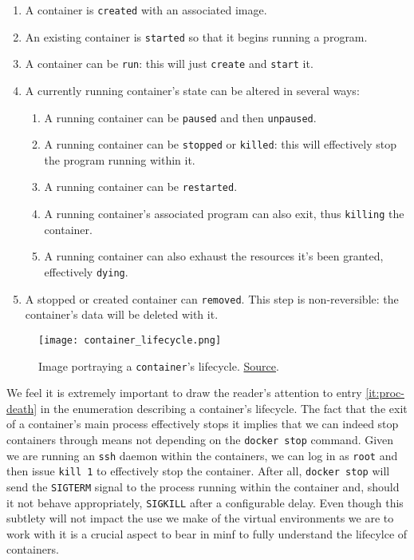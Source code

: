                 \begin{enumerate}
                    \item A container is \texttt{created} with an associated image.
                    \item An existing container is \texttt{started} so that it begins running a program.
                    \item A container can be \texttt{run}: this will just \texttt{create} and \texttt{start} it.
                    \item A currently running container's state can be altered in several ways:
                    \begin{enumerate}
                        \item A running container can be \texttt{paused} and then \texttt{unpaused}.
                        \item A running container can be \texttt{stopped} or \texttt{killed}: this will effectively stop the program running within it.
                        \item A running container can be \texttt{restarted}.
                        \item A running container's associated program can also exit, thus \texttt{killing} the container. \label{it:proc-death}
                        \item A running container can also exhaust the resources it's been granted, effectively \texttt{dying}.
                    \end{enumerate}
                    \item A stopped or created container can \texttt{removed}. This step is non-reversible: the container's data will be deleted with it.
                \end{enumerate}

                \begin{figure}
                    \centering
                    \texttt{[image: container\_lifecycle.png]}
                    \caption{Image portraying a \texttt{container}'s lifecycle. \href{https://miro.medium.com/max/1129/1*vca4e-SjpzSL5H401p4LCg.png}{Source}.}
                    \label{fig:container-lifecycle}
                \end{figure}

                We feel it is extremely important to draw the reader's attention to entry \ref{it:proc-death} in the enumeration describing a container's lifecycle. The fact that the exit of a container's main process effectively stops it implies that we can indeed stop containers through means not depending on the \texttt{docker stop} command. Given we are running an \texttt{ssh} daemon within the containers, we can log in as \texttt{root} and then issue \texttt{kill 1} to effectively stop the container. After all, \texttt{docker stop} will send the \texttt{SIGTERM} signal to the process running within the container and, should it not behave appropriately, \texttt{SIGKILL} after a configurable delay. Even though this subtlety will not impact the use we make of the virtual environments we are to work with it is a crucial aspect to bear in minf to fully understand the lifecylce of containers.\\

